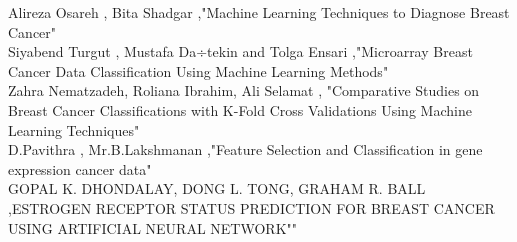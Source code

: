 \documentclass[12pt,journal,compsoc]{IEEEtran}
\begin{document}
\begin{thebibliography}{1}
\bibitem{}Alireza Osareh , Bita Shadgar ,"Machine Learning Techniques to Diagnose Breast
Cancer"
\\
\bibitem{}Siyabend Turgut , Mustafa Da÷tekin and Tolga Ensari ,"Microarray Breast Cancer Data Classification Using
Machine Learning Methods"
\\
\bibitem{}Zahra Nematzadeh, Roliana Ibrahim, Ali Selamat , "Comparative Studies on Breast Cancer
Classifications with K-Fold Cross Validations Using
Machine Learning Techniques"
\\
\bibitem{}D.Pavithra , Mr.B.Lakshmanan ,"Feature Selection and Classification in gene
expression cancer data"
\\
\bibitem{}GOPAL K. DHONDALAY, DONG L. TONG, GRAHAM R. BALL ,ESTROGEN RECEPTOR STATUS PREDICTION FOR BREAST CANCER
USING ARTIFICIAL NEURAL NETWORK""
\end{thebibliography}
\end{document}
